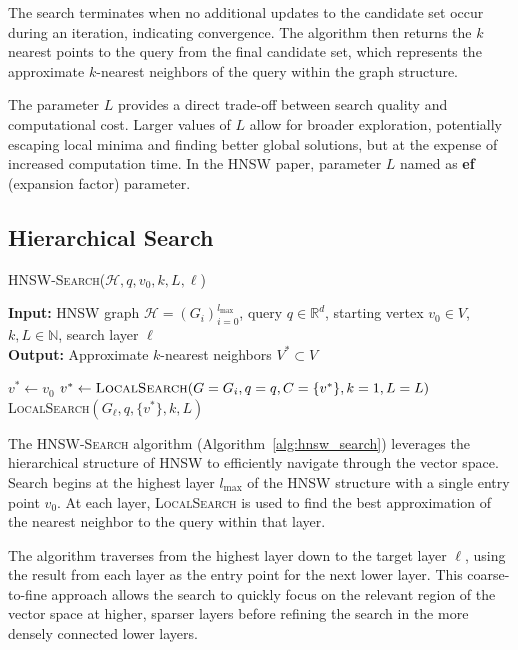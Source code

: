 \documentclass{article}
\begin{document}
The search terminates when no additional updates to the candidate set occur during an iteration, indicating convergence. The algorithm then returns the $k$ nearest points to the query from the final candidate set, which represents the approximate $k$-nearest neighbors of the query within the graph structure.

The parameter $L$ provides a direct trade-off between search quality and computational cost. Larger values of $L$ allow for broader exploration, potentially escaping local minima and finding better global solutions, but at the expense of increased computation time. In the HNSW paper, parameter $L$ named as \textbf{ef} (expansion factor) parameter.

\subsection{Hierarchical Search}

\begin{algorithm}
\caption{\textsc{HNSW-Search}($\mathcal{H}, q, v_0, k, L, \ell$)}\label{alg:hnsw_search}
\textbf{Input:} HNSW graph $\mathcal{H} = (G_i)_{i=0}^{l_{\max}}$, query $q \in \mathbb{R}^d$, starting vertex $v_0 \in V$, $k, L \in \mathbb{N}$, search layer $\ell$ \\
\textbf{Output:} Approximate $k$-nearest neighbors $V^* \subset V$
\begin{algorithmic}[1]
\State $v^* \gets v_0$ 
    \State $v^* \gets \textsc{LocalSearch}(G=G_i, q=q, C=\{v^*\}, k=1, L=L)$
\EndFor
\State \Return \textsc{LocalSearch}$(G_\ell, q, \{v^*\}, k, L)$
\end{algorithmic}
\end{algorithm}

The \textsc{HNSW-Search} algorithm (Algorithm~\ref{alg:hnsw_search}) leverages the hierarchical structure of HNSW to efficiently navigate through the vector space. Search begins at the highest layer $l_{\max}$ of the HNSW structure with a single entry point $v_0$. At each layer, \textsc{LocalSearch} is used to find the best approximation of the nearest neighbor to the query within that layer.

The algorithm traverses from the highest layer down to the target layer $\ell$, using the result from each layer as the entry point for the next lower layer. This coarse-to-fine approach allows the search to quickly focus on the relevant region of the vector space at higher, sparser layers before refining the search in the more densely connected lower layers.
\end{document}
